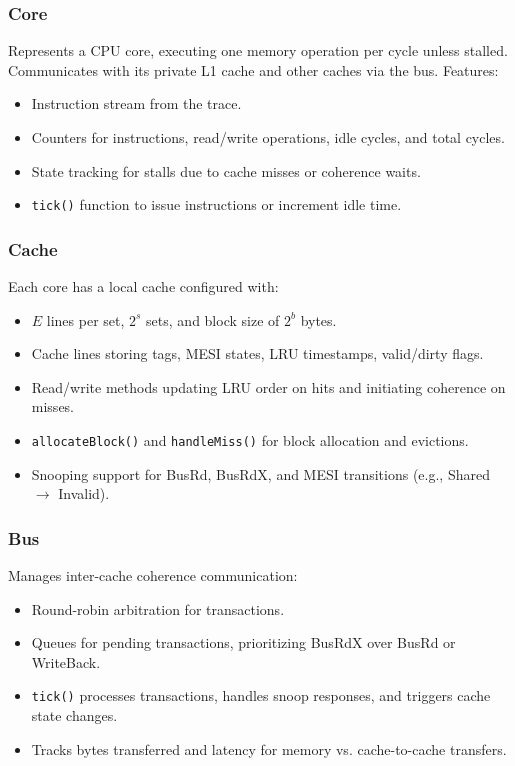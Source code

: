 \documentclass[11pt]{article}
\begin{document}
\subsubsection{Core}
Represents a CPU core, executing one memory operation per cycle unless stalled. Communicates with its private L1 cache and other caches via the bus. Features:
\begin{itemize}
    \item Instruction stream from the trace.
    \item Counters for instructions, read/write operations, idle cycles, and total cycles.
    \item State tracking for stalls due to cache misses or coherence waits.
    \item \texttt{tick()} function to issue instructions or increment idle time.
\end{itemize}

\subsubsection{Cache}
Each core has a local cache configured with:
\begin{itemize}
    \item $E$ lines per set, $2^s$ sets, and block size of $2^b$ bytes.
    \item Cache lines storing tags, MESI states, LRU timestamps, valid/dirty flags.
    \item Read/write methods updating LRU order on hits and initiating coherence on misses.
    \item \texttt{allocateBlock()} and \texttt{handleMiss()} for block allocation and evictions.
    \item Snooping support for BusRd, BusRdX, and MESI transitions (e.g., Shared $\to$ Invalid).
\end{itemize}

\subsubsection{Bus}
Manages inter-cache coherence communication:
\begin{itemize}
    \item Round-robin arbitration for transactions.
    \item Queues for pending transactions, prioritizing BusRdX over BusRd or WriteBack.
    \item \texttt{tick()} processes transactions, handles snoop responses, and triggers cache state changes.
    \item Tracks bytes transferred and latency for memory vs. cache-to-cache transfers.
\end{itemize}
\end{document}
